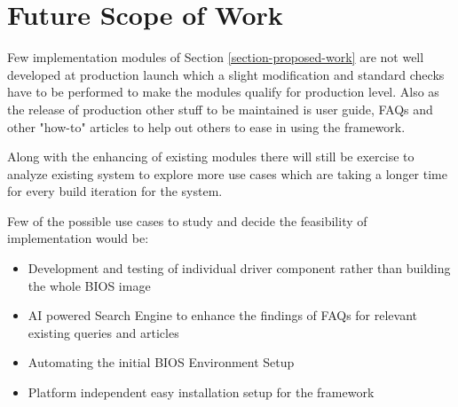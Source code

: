 \section{Future Scope of Work}\label{section-future-scope}
Few implementation modules of Section \ref{section-proposed-work} are not well developed at production launch which a slight modification and standard checks have to be performed to make the modules qualify for production level. Also as the release of production other stuff to be maintained is user guide, FAQs and other "how-to" articles to help out others to ease in using the framework.

Along with the enhancing of existing modules there will still be exercise to analyze existing system to explore more use cases which are taking a longer time for every build iteration for the system.

Few of the possible use cases to study and decide the feasibility of implementation would be:

\begin{itemize}
	\item Development and testing of individual driver component rather than building the whole BIOS image
	\item AI powered Search Engine to enhance the findings of FAQs for relevant existing queries and articles
	\item Automating the initial BIOS Environment Setup
	\item Platform independent easy installation setup for the framework
\end{itemize}

